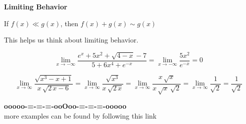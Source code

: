 \documentclass{ximera}
\begin{document}
\begin{idea} \textbf{\textcolor{blue!55!black}{Limiting Behavior}}



If $f(x) \ll g(x)$, then $f(x) + g(x) \sim g(x)$



\end{idea}


This helps us think about limiting behavior.



\begin{example}


\[
\lim\limits_{x \to -\infty} \frac{e^{x} + 5x^2 + \sqrt{4-x} - 7}{5 + 6x^4 + e^{-x}} = \lim\limits_{x \to -\infty} \frac{5x^2}{e^{-x}} = 0
\]



\end{example}







\begin{example}


\[
\lim\limits_{x \to \infty} \frac{\sqrt{x^3 - x + 1}}{x \, \sqrt{2 \, x-6}} = \lim\limits_{x \to \infty} \frac{\sqrt{x^3}}{x \, \sqrt{2 \, x}} = \lim\limits_{x \to \infty} \frac{x \, \sqrt{x}}{x \, \sqrt{x} \, \sqrt{2} } = \lim\limits_{x \to \infty} \frac{1}{\sqrt{2} } = \frac{1}{\sqrt{2} }
\]



\end{example}













\begin{center}
\textbf{\textcolor{green!50!black}{ooooo-=-=-=-ooOoo-=-=-=-ooooo}} \\

more examples can be found by following this link\\ 

\end{center}
\end{document}
